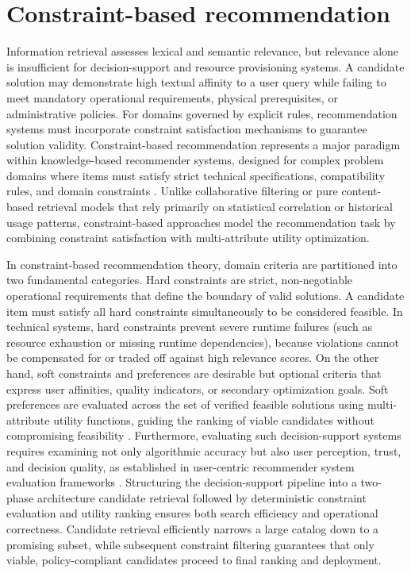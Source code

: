 \section{Constraint-based recommendation}

Information retrieval assesses lexical and semantic relevance, but relevance alone is insufficient for decision-support and resource provisioning systems. A candidate solution may demonstrate high textual affinity to a user query while failing to meet mandatory operational requirements, physical prerequisites, or administrative policies. For domains governed by explicit rules, recommendation systems must incorporate constraint satisfaction mechanisms to guarantee solution validity. Constraint-based recommendation represents a major paradigm within knowledge-based recommender systems, designed for complex problem domains where items must satisfy strict technical specifications, compatibility rules, and domain constraints \cite{constraintrec}. Unlike collaborative filtering or pure content-based retrieval models that rely primarily on statistical correlation or historical usage patterns, constraint-based approaches model the recommendation task by combining constraint satisfaction with multi-attribute utility optimization.

In constraint-based recommendation theory, domain criteria are partitioned into two fundamental categories. Hard constraints are strict, non-negotiable operational requirements that define the boundary of valid solutions. A candidate item must satisfy all hard constraints simultaneously to be considered feasible. In technical systems, hard constraints prevent severe runtime failures (such as resource exhaustion or missing runtime dependencies), because violations cannot be compensated for or traded off against high relevance scores. On the other hand, soft constraints and preferences are desirable but optional criteria that express user affinities, quality indicators, or secondary optimization goals. Soft preferences are evaluated across the set of verified feasible solutions using multi-attribute utility functions, guiding the ranking of viable candidates without compromising feasibility \cite{herlocker,jarvelin}. Furthermore, evaluating such decision-support systems requires examining not only algorithmic accuracy but also user perception, trust, and decision quality, as established in user-centric recommender system evaluation frameworks \cite{pu,knijnenburg}. Structuring the decision-support pipeline into a two-phase architecture candidate retrieval followed by deterministic constraint evaluation and utility ranking ensures both search efficiency and operational correctness. Candidate retrieval efficiently narrows a large catalog down to a promising subset, while subsequent constraint filtering guarantees that only viable, policy-compliant candidates proceed to final ranking and deployment.